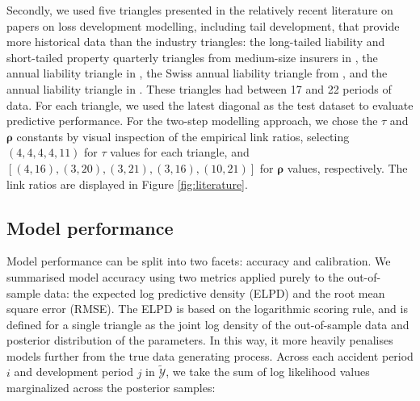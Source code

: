 Secondly, we used five
triangles presented in the
relatively recent literature on papers on loss development
modelling,
including tail development, that provide more
historical data than the industry triangles:
the long-tailed liability and short-tailed property 
quarterly triangles from medium-size insurers
in \cite{balona2022}, the annual liability triangle in \cite{merz2015},
the Swiss annual liability triangle from \cite{gisler2009},
and the annual liability triangle in \cite{verrall2012}.
These triangles had between 17 and 22 periods of
data. For each triangle, we used the latest diagonal as the
test dataset to evaluate predictive performance.
For the two-step modelling approach, we chose the
$\tau$ and $\bm{\rho}$ constants
by visual inspection of the empirical link ratios,
selecting $(4, 4, 4, 4, 11)$ for $\tau$ values
for each triangle,
and $[(4, 16), (3, 20), (3, 21), (3, 16), (10, 21)]$
for $\bm{\rho}$ values, respectively.
The link ratios are displayed in Figure \ref{fig:literature}.

\subsection{Model performance}
Model performance can be split into two facets:
accuracy and calibration.
We summarised model accuracy using two metrics
applied purely to the out-of-sample data: the expected
log predictive density (ELPD) and the root mean
square error (RMSE). 
The ELPD \citep{vehtari2017} is based on the logarithmic scoring
rule, and is defined for a single triangle
as the joint log density of the out-of-sample
data and posterior distribution of the parameters. 
In this way, it more heavily
penalises models further from
the true data generating process.
Across each accident period $i$ and development
period $j$ in $\mathcal{\tilde{Y}}$, we take the
sum of log likelihood values marginalized across the posterior
samples:

